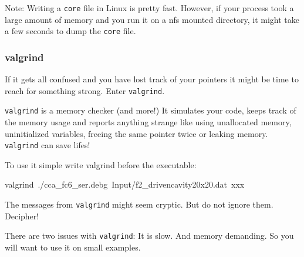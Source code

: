 Note: Writing a \texttt{core} file in Linux is pretty fast. However,
if your process took a large amount of memory and you run it on a
nfs mounted directory, it might take a few seconds to dump the \texttt{core}
file.


\subsubsection{valgrind}

If it gets all confused and you have lost track of your pointers it
might be time to reach for something strong. Enter \texttt{valgrind}.

\texttt{valgrind} is a memory checker (and more!) It simulates your
code, keeps track of the memory usage and reports anything strange
like using unallocated memory, uninitialized variables, freeing the
same pointer twice or leaking memory. \texttt{valgrind} can save lifes!

To use it simple write valgrind before the \ccarat{} executable:

\begin{lyxcode}
valgrind~./cca\_fc6\_ser.debg~Input/f2\_drivencavity20x20.dat~xxx
\end{lyxcode}
The messages from \texttt{valgrind} might seem cryptic. But do not
ignore them. Decipher!

There are two issues with \texttt{valgrind}: It is slow. And memory
demanding. So you will want to use it on small examples.
